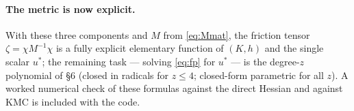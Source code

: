 \documentclass[11pt]{article}
\begin{document}
\paragraph{The metric is now explicit.}
With these three components and $M$ from \eqref{eq:Mmat}, the friction tensor
$\zeta=\chi M^{-1}\chi$ is a fully explicit elementary function of $(K,h)$ and the single scalar
$u^*$; the remaining task --- solving \eqref{eq:fp} for $u^*$ --- is the degree-$z$ polynomial of
\S6 (closed in radicals for $z\le4$; closed-form parametric for all $z$). A worked numerical check
of these formulas against the direct Hessian and against KMC is included with the code.
\end{document}
